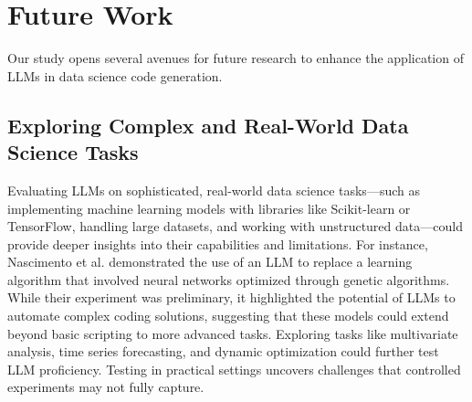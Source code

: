 \documentclass[conference]{IEEEtran}
\begin{document}




\section{Future Work} \label{sec:threats}
Our study opens several avenues for future research to enhance the application of LLMs in data science code generation.


\subsection{Exploring Complex and Real-World Data Science Tasks}
Evaluating LLMs on sophisticated, real-world data science tasks—such as implementing machine learning models with libraries like Scikit-learn or TensorFlow, handling large datasets, and working with unstructured data—could provide deeper insights into their capabilities and limitations. For instance, Nascimento et al. \cite{nascimento2023gptloop} demonstrated the use of an LLM to replace a learning algorithm that involved neural networks optimized through genetic algorithms. While their experiment was preliminary, it highlighted the potential of LLMs to automate complex coding solutions, suggesting that these models could extend beyond basic scripting to more advanced tasks. Exploring tasks like multivariate analysis, time series forecasting, and dynamic optimization could further test LLM proficiency. Testing in practical settings uncovers challenges that controlled experiments may not fully capture.
\end{document}
